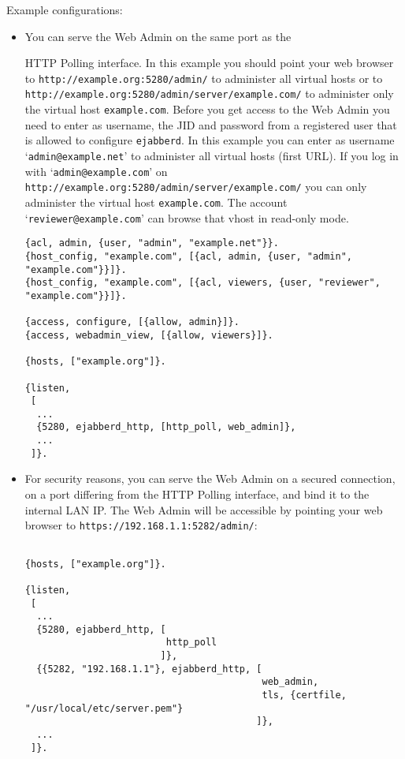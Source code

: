\documentclass[a4paper,10pt]{book}
\newcommand{\ind}[1]{\begin{latexonly}\index{#1}\end{latexonly}}
\newcommand{\jid}[1]{\texttt{#1}}
\newcommand{\ejabberd}{\texttt{ejabberd}}
\begin{document}
Example configurations:
\begin{itemize}
\item You can serve the Web Admin on the same port as the
  \ind{protocols!XEP-0025: HTTP Polling}HTTP Polling interface. In this example
  you should point your web browser to \verb|http://example.org:5280/admin/| to
  administer all virtual hosts or to
  \verb|http://example.org:5280/admin/server/example.com/| to administer only
  the virtual host \jid{example.com}. Before you get access to the Web Admin
  you need to enter as username, the JID and password from a registered user
  that is allowed to configure \ejabberd{}. In this example you can enter as
  username `\jid{admin@example.net}' to administer all virtual hosts (first
  URL). If you log in with `\jid{admin@example.com}' on \\
  \verb|http://example.org:5280/admin/server/example.com/| you can only
  administer the virtual host \jid{example.com}.
  The account `\jid{reviewer@example.com}' can browse that vhost in read-only mode.
\begin{verbatim}
{acl, admin, {user, "admin", "example.net"}}.
{host_config, "example.com", [{acl, admin, {user, "admin", "example.com"}}]}.
{host_config, "example.com", [{acl, viewers, {user, "reviewer", "example.com"}}]}.

{access, configure, [{allow, admin}]}.
{access, webadmin_view, [{allow, viewers}]}.

{hosts, ["example.org"]}.

{listen,
 [
  ...
  {5280, ejabberd_http, [http_poll, web_admin]},
  ...
 ]}.
\end{verbatim}
\item For security reasons, you can serve the Web Admin on a secured
  connection, on a port differing from the HTTP Polling interface, and bind it
  to the internal LAN IP. The Web Admin will be accessible by pointing your
  web browser to \verb|https://192.168.1.1:5282/admin/|:
\begin{verbatim}

{hosts, ["example.org"]}.

{listen,
 [
  ...
  {5280, ejabberd_http, [
                         http_poll
                        ]},
  {{5282, "192.168.1.1"}, ejabberd_http, [
                                          web_admin,
                                          tls, {certfile, "/usr/local/etc/server.pem"}
                                         ]},
  ...
 ]}.
\end{verbatim}
\end{itemize}
\end{document}
